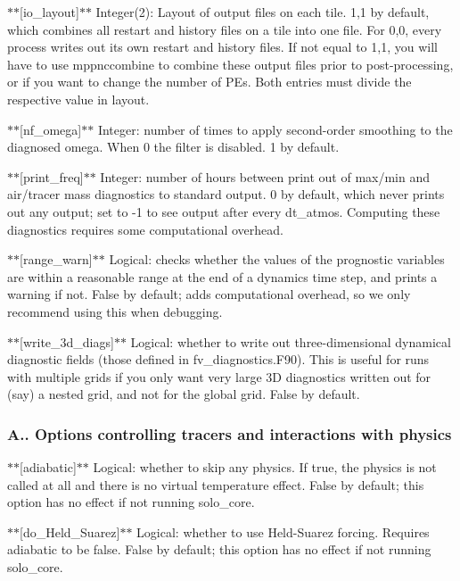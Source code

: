 $\ast$$\ast$\mbox{[}io\-\_\-layout\mbox{]}$\ast$$\ast$ Integer(2)\-: Layout of output files on each tile. 1,1 by default, which combines all restart and history files on a tile into one file. For 0,0, every process writes out its own restart and history files. If not equal to 1,1, you will have to use mppnccombine to combine these output files prior to post-\/processing, or if you want to change the number of P\-Es. Both entries must divide the respective value in layout.

$\ast$$\ast$\mbox{[}nf\-\_\-omega\mbox{]}$\ast$$\ast$ Integer\-: number of times to apply second-\/order smoothing to the diagnosed omega. When 0 the filter is disabled. 1 by default.

$\ast$$\ast$\mbox{[}print\-\_\-freq\mbox{]}$\ast$$\ast$ Integer\-: number of hours between print out of max/min and air/tracer mass diagnostics to standard output. 0 by default, which never prints out any output; set to -\/1 to see output after every dt\-\_\-atmos. Computing these diagnostics requires some computational overhead.

$\ast$$\ast$\mbox{[}range\-\_\-warn\mbox{]}$\ast$$\ast$ Logical\-: checks whether the values of the prognostic variables are within a reasonable range at the end of a dynamics time step, and prints a warning if not. False by default; adds computational overhead, so we only recommend using this when debugging.

$\ast$$\ast$\mbox{[}write\-\_\-3d\-\_\-diags\mbox{]}$\ast$$\ast$ Logical\-: whether to write out three-\/dimensional dynamical diagnostic fields (those defined in fv\-\_\-diagnostics.\-F90). This is useful for runs with multiple grids if you only want very large 3\-D diagnostics written out for (say) a nested grid, and not for the global grid. False by default.

\subsubsection*{A.. Options controlling tracers and interactions with physics}

$\ast$$\ast$\mbox{[}adiabatic\mbox{]}$\ast$$\ast$ Logical\-: whether to skip any physics. If true, the physics is not called at all and there is no virtual temperature effect. False by default; this option has no effect if not running solo\-\_\-core.

$\ast$$\ast$\mbox{[}do\-\_\-\-Held\-\_\-\-Suarez\mbox{]}$\ast$$\ast$ Logical\-: whether to use Held-\/\-Suarez forcing. Requires adiabatic to be false. False by default; this option has no effect if not running solo\-\_\-core.

